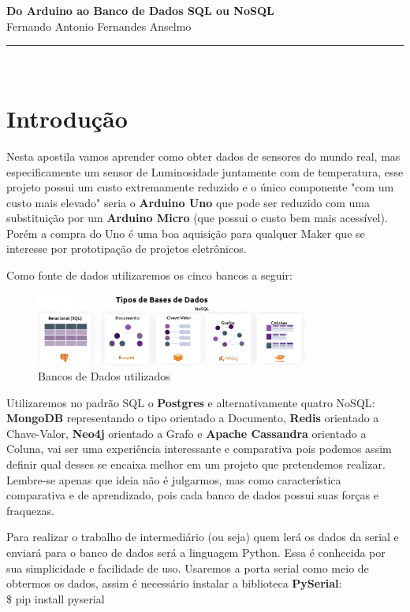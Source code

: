\documentclass[a4paper,11pt]{article}
\newcommand{\rttitulo}{Do Arduino ao Banco de Dados SQL ou NoSQL}
\begin{document}
\thispagestyle{firstpage}
\begin{center}
	\hfill \break
	{ \huge \bfseries \rttitulo} \\[0.2 cm]
	Fernando Antonio Fernandes Anselmo
	\rule{\linewidth}{0.2 mm} \\[0.4 cm]
\end{center}

\section*{Introdução}
Nesta apostila vamos aprender como obter dados de sensores do mundo real, mas especificamente um sensor de Luminosidade juntamente com de temperatura, esse projeto possui um custo extremamente reduzido e o único componente "com um custo mais elevado" seria o \textbf{Arduino Uno} que pode ser reduzido com uma substituição por um \textbf{Arduino Micro} (que possui o custo bem mais acessível). Porém a compra do Uno é uma boa aquisição para qualquer Maker que se interesse por prototipação de projetos eletrônicos.

Como fonte de dados utilizaremos os cinco bancos a seguir:
\begin{figure}[H]
	\centering
	\includegraphics[width=0.8\textwidth]{images/NoSQL}
	\caption{Bancos de Dados utilizados}
\end{figure}

Utilizaremos no padrão SQL o \textbf{Postgres} e alternativamente quatro NoSQL: \textbf{MongoDB} representando o tipo orientado a Documento, \textbf{Redis} orientado a Chave-Valor, \textbf{Neo4j} orientado a Grafo e \textbf{Apache Cassandra} orientado a Coluna, vai ser uma experiência interessante e comparativa pois podemos assim definir qual desses se encaixa melhor em um projeto que pretendemos realizar. Lembre-se apenas que ideia não é julgarmos, mas como característica comparativa e de aprendizado, pois cada banco de dados possui suas forças e fraquezas.

Para realizar o trabalho de intermediário (ou seja) quem lerá os dados da serial e enviará para o banco de dados será a linguagem Python. Essa é conhecida por sua simplicidade e facilidade de uso. Usaremos a porta serial como meio de obtermos os dados, assim é necessário instalar a biblioteca \textbf{PySerial}: \\
{\ttfamily\$ pip install pyserial}
\end{document}
